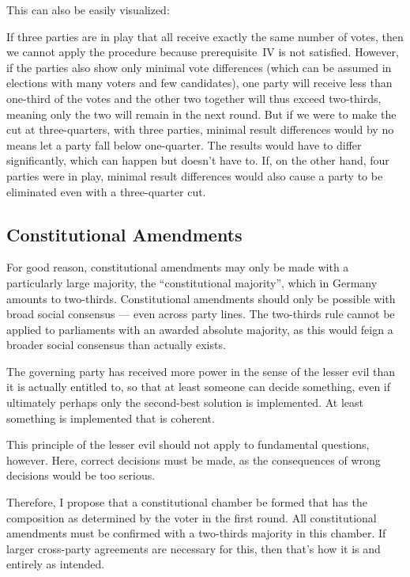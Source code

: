 This can also be easily visualized:

If three parties are in play that all receive exactly the same number of votes, then we cannot
apply the procedure because prerequisite~IV is not satisfied. However, if the parties also
show only minimal vote differences (which can be assumed in elections with many voters and few
candidates), one party will receive less than one-third of the votes and
the other two together will thus exceed two-thirds, meaning only the
two will remain in the next round. But if we were to make the cut at three-quarters, with three
parties, minimal result differences would by no means let a party fall below one-quarter.
The results would have to differ significantly, which can happen but doesn't have to.
If, on the other hand, four parties were in play, minimal result differences would also
cause a party to be eliminated even with a three-quarter cut.

\subsection{Constitutional Amendments} \label{subsec:constitutional-amendments}

For good reason, constitutional amendments may only be made with a particularly large majority, the
\enquote{constitutional majority}, which in Germany amounts to two-thirds. Constitutional amendments should only be possible with broad social consensus ---
even across party lines. The two-thirds rule cannot be applied to parliaments with
an awarded absolute majority, as this would feign a broader social
consensus than actually exists.

The governing party has received more power in the sense of the
lesser evil than it is actually entitled to, so that at least someone can
decide something, even if ultimately perhaps only the second-best solution is implemented.
At least something is implemented that is coherent.

This principle of the lesser evil should not apply to fundamental questions, however.
Here, correct decisions must be made, as the consequences of wrong decisions would be too serious.

Therefore, I propose that a constitutional chamber be formed that has the composition
as determined by the voter in the first round. All constitutional amendments must be
confirmed with a two-thirds majority in this chamber. If larger cross-party
agreements are necessary for this, then that's how it is and entirely as intended.

